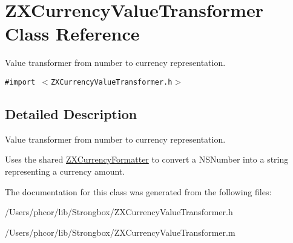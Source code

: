 \hypertarget{interface_z_x_currency_value_transformer}{
\section{ZXCurrencyValueTransformer Class Reference}
\label{interface_z_x_currency_value_transformer}
}
Value transformer from number to currency representation.  


{\tt \#import $<$ZXCurrencyValueTransformer.h$>$}



\subsection{Detailed Description}
Value transformer from number to currency representation. 

Uses the shared \hyperlink{interface_z_x_currency_formatter}{ZXCurrencyFormatter} to convert a NSNumber into a string representing a currency amount. 

The documentation for this class was generated from the following files:\begin{CompactItemize}
\item 
/Users/phcor/lib/Strongbox/ZXCurrencyValueTransformer.h\item 
/Users/phcor/lib/Strongbox/ZXCurrencyValueTransformer.m\end{CompactItemize}
